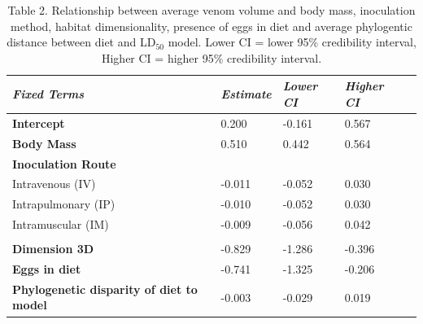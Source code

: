 \begin{table}[H]
  \centering
    \caption*{Table 2. Relationship between average venom volume and body mass, inoculation method, habitat dimensionality, presence of eggs in diet and average phylogentic distance between diet and LD$_{50}$ model. Lower CI = lower 95\% credibility interval, Higher CI = higher 95\% credibility interval.}
\begin{tabular}{*5l}    \toprule
\emph{Fixed Terms} & \emph{Estimate} & \emph{Lower CI} & \emph{Higher CI}\\\midrule
\textbf{Intercept} & 0.200  & -0.161 & 0.567 \\ 
\textbf{Body Mass} & 0.510  & 0.442 & 0.564 \\ 
\textbf{Inoculation Route} &  &  &  \\ 
 Intravenous (IV) & -0.011 & -0.052 & 0.030 \\
 Intrapulmonary (IP) & -0.010 & -0.052 & 0.030 \\ 
 Intramuscular (IM) & -0.009 & -0.056 & 0.042 \\
  &  &  &  \\ 
\textbf{Dimension 3D} & -0.829 & -1.286 & -0.396 \\ 
\textbf{Eggs in diet} & -0.741 & -1.325 & -0.206 \\ 
\textbf{Phylogenetic disparity of diet to model} & -0.003 & -0.029 & 0.019 \\\bottomrule
 \hline
\end{tabular}
  \label{tbl:Table 2.}
\end{table}



